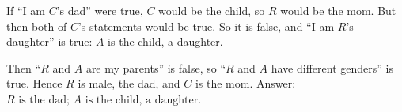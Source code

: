 If ``I am $C$'s dad'' were true, $C$ would be the child, so $R$ would be the mom. But then both of $C$'s statements would be true. So it is false, and ``I am $R$'s daughter'' is true: $A$ is the child, a daughter.

Then ``$R$ and $A$ are my parents'' is false, so ``$R$ and $A$ have different genders'' is true. Hence $R$ is male, the dad, and $C$ is the mom. Answer: $\boxed{R\text{ is the dad; }A\text{ is the child, a daughter}}$.
